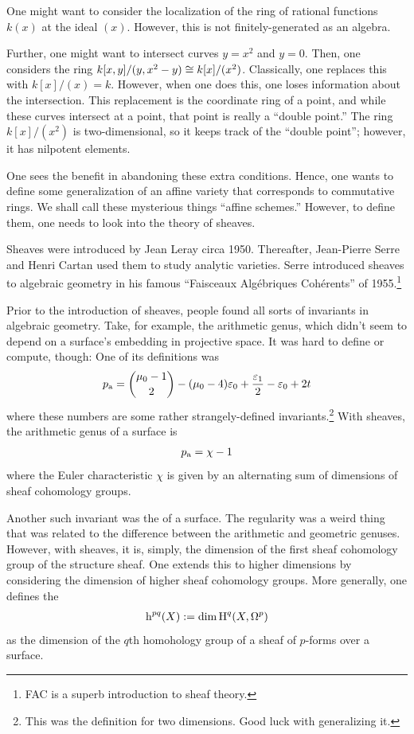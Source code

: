 \documentclass [11 pt, oneside, margin = 1 in] {article}
\begin{document}
One might want to consider the localization of the ring of rational functions $k(x)$ at the ideal $(x)$. However, this is not finitely-generated as an algebra.

Further, one might want to intersect curves $y=x^2$ and $y=0$. Then, one considers the ring $k[x,y]/(y,x^2-y) \isomto k[x]/ (x^2)$. Classically, one replaces this with $k[x]/(x) = k$. However, when one does this, one loses information about the intersection. This replacement is the coordinate ring of a point, and while these curves intersect at a point, that point is really a ``double point.'' The ring $k[x]/(x^2)$ is two-dimensional, so it keeps track of the ``double point''; however, it has nilpotent elements.

One sees the benefit in abandoning these extra conditions. Hence, one wants to define some generalization of an affine variety that corresponds to commutative rings. We shall call these mysterious things ``affine schemes.'' However, to define them, one needs to look into the theory of sheaves.

Sheaves were introduced by Jean Leray circa 1950. Thereafter, Jean-Pierre Serre and Henri Cartan used them to study analytic varieties. Serre introduced sheaves to algebraic geometry in his famous ``Faisceaux Algébriques Cohérents'' of 1955.\footnote{FAC is a superb introduction to sheaf theory.}

Prior to the introduction of sheaves, people found all sorts of invariants in algebraic geometry. Take, for example, the arithmetic genus, which didn't seem to depend on a surface's embedding in projective space. It was hard to define or compute, though: One of its definitions was
\begin{align*}
	p\textsubscript{a} = \binom{\mu_0-1}{2} - (\mu_0 - 4) \epsilon_0 + \frac{\epsilon_1}{2} - \epsilon_0+2t
\end{align*}
where these numbers are some rather strangely-defined invariants.\footnote{This was the definition for two dimensions. Good luck with generalizing it.} With sheaves, the arithmetic genus of a surface is
\begin{align*}
	p\textsubscript{a} = \chi -1
\end{align*}
where the Euler characteristic $\chi$ is given by an alternating sum of dimensions of sheaf cohomology groups.

Another such invariant was the  of a surface. The regularity was a weird thing that was related to the difference between the arithmetic and geometric genuses. However, with sheaves, it is, simply, the dimension of the first sheaf cohomology group of the structure sheaf. One extends this to higher dimensions by considering the dimension of higher sheaf cohomology groups. More generally, one defines the  
\begin{align*}
	{\h}^{pq}(X) := \dim \HH^q(X,\Omega^p) 
\end{align*}
as the dimension of the $q$th homohology group of a sheaf of $p$-forms over a surface.
\end{document}
